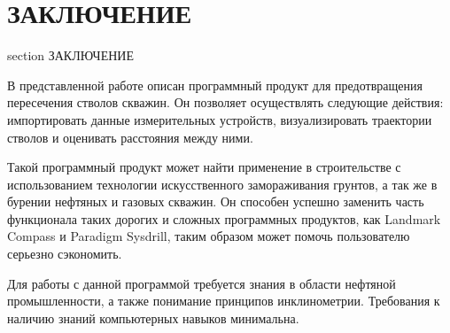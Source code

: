 \newpage
\section*{ЗАКЛЮЧЕНИЕ}
 {section} {ЗАКЛЮЧЕНИЕ}

В представленной работе описан программный продукт для предотвращения пересечения стволов скважин.
Он позволяет осуществлять следующие действия:
импортировать данные измерительных устройств, визуализировать траектории стволов и оценивать расстояния между ними.

Такой программный продукт может найти применение в строительстве с использованием технологии искусственного замораживания
грунтов, а так же в бурении нефтяных и газовых скважин. Он способен успешно заменить часть функционала таких дорогих и сложных
программных продуктов, как Landmark Compass и Paradigm Sysdrill, таким образом может помочь пользователю серьезно сэкономить.

Для работы с данной программой требуется знания в области нефтяной промышленности, а также понимание принципов инклинометрии.
Требования к наличию знаний компьютерных навыков минимальна.

